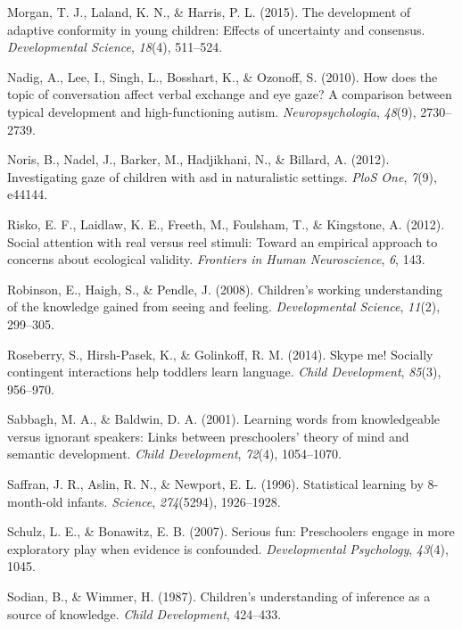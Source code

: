 \documentclass[floatsintext,man]{apa6}
\theoremstyle{definition}
\theoremstyle{definition}
\theoremstyle{definition}
\theoremstyle{remark}
\begin{document}
\hypertarget{ref-morgan2015development}{}
Morgan, T. J., Laland, K. N., \& Harris, P. L. (2015). The development
of adaptive conformity in young children: Effects of uncertainty and
consensus. \emph{Developmental Science}, \emph{18}(4), 511--524.

\hypertarget{ref-nadig2010does}{}
Nadig, A., Lee, I., Singh, L., Bosshart, K., \& Ozonoff, S. (2010). How
does the topic of conversation affect verbal exchange and eye gaze? A
comparison between typical development and high-functioning autism.
\emph{Neuropsychologia}, \emph{48}(9), 2730--2739.

\hypertarget{ref-noris2012investigating}{}
Noris, B., Nadel, J., Barker, M., Hadjikhani, N., \& Billard, A. (2012).
Investigating gaze of children with asd in naturalistic settings.
\emph{PloS One}, \emph{7}(9), e44144.

\hypertarget{ref-risko2012social}{}
Risko, E. F., Laidlaw, K. E., Freeth, M., Foulsham, T., \& Kingstone, A.
(2012). Social attention with real versus reel stimuli: Toward an
empirical approach to concerns about ecological validity.
\emph{Frontiers in Human Neuroscience}, \emph{6}, 143.

\hypertarget{ref-robinson2008children}{}
Robinson, E., Haigh, S., \& Pendle, J. (2008). Children's working
understanding of the knowledge gained from seeing and feeling.
\emph{Developmental Science}, \emph{11}(2), 299--305.

\hypertarget{ref-roseberry2014skype}{}
Roseberry, S., Hirsh-Pasek, K., \& Golinkoff, R. M. (2014). Skype me!
Socially contingent interactions help toddlers learn language.
\emph{Child Development}, \emph{85}(3), 956--970.

\hypertarget{ref-sabbagh2001learning}{}
Sabbagh, M. A., \& Baldwin, D. A. (2001). Learning words from
knowledgeable versus ignorant speakers: Links between preschoolers'
theory of mind and semantic development. \emph{Child Development},
\emph{72}(4), 1054--1070.

\hypertarget{ref-saffran1996statistical}{}
Saffran, J. R., Aslin, R. N., \& Newport, E. L. (1996). Statistical
learning by 8-month-old infants. \emph{Science}, \emph{274}(5294),
1926--1928.

\hypertarget{ref-schulz2007serious}{}
Schulz, L. E., \& Bonawitz, E. B. (2007). Serious fun: Preschoolers
engage in more exploratory play when evidence is confounded.
\emph{Developmental Psychology}, \emph{43}(4), 1045.

\hypertarget{ref-sodian1987children}{}
Sodian, B., \& Wimmer, H. (1987). Children's understanding of inference
as a source of knowledge. \emph{Child Development}, 424--433.
\end{document}
